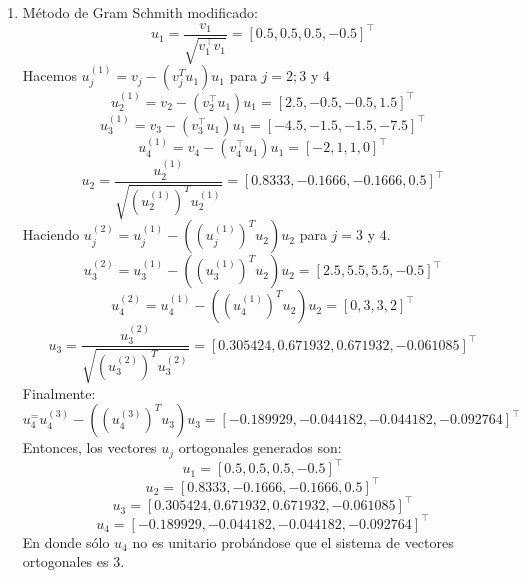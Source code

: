\begin{enumerate}[label=(\alph*)]
\item Método de Gram Schmith modificado:
\begin{equation}
    u_1 = \frac{v_1}{\sqrt{v_1^\intercal v_1}} = [0.5, 0.5, 0.5, -0.5]^\intercal
\end{equation}
Hacemos $u_j^{(1)}=v_j-(v_j^T u_1)u_1$ para $j=2;3$ y $4$
\begin{equation}
    u_2^{(1)}=v_2-(v_2^\intercal u_1)u_1 = [2.5, -0.5, -0.5, 1.5]^\intercal
\end{equation}
\begin{equation}
    u_3^{(1)}=v_3-(v_3^\intercal u_1)u_1 = [-4.5,  -1.5,  -1.5,  -7.5]^\intercal
\end{equation}
\begin{equation}
    u_4^{(1)}=v_4-(v_4^\intercal u_1)u_1 = [-2, 1, 1, 0]^\intercal
\end{equation}
\begin{equation}
    u_2=\frac{u_2^{(1)}}{\sqrt{(u_2^{(1)})^T u_2^{(1)}}} = [0.8333, -0.1666, -0.1666, 0.5]^\intercal
\end{equation}
Haciendo $u_j^{(2)}=u_j^{(1)}-((u_j^{(1)})^T u_2)u_2$ para $j=3$ y $4$.
\begin{equation}
    u_3^{(2)}=u_3^{(1)}-((u_3^{(1)})^T u_2)u_2 = [2.5,  5.5,  5.5,  -0.5]^\intercal
\end{equation}
\begin{equation}
    u_4^{(2)}=u_4^{(1)}-((u_4^{(1)})^T u_2)u_2 = [0,  3,  3,  2]^\intercal
\end{equation}
\begin{equation}
    u_3=\frac{u_3^{(2)}}{\sqrt{(u_3^{(2)})^T u_3^{(2)}}} = [0.305424,  0.671932,  0.671932,  -0.061085]^\intercal
\end{equation}
Finalmente:
\begin{equation}
    u_4^=u_4^{(3)}-((u_4^{(3)})^T u_3)u_3 = [-0.189929, -0.044182, -0.044182, -0.092764]^\intercal
\end{equation}
Entonces, los vectores $u_j$ ortogonales generados son:
\begin{equation}
    u_1 = [0.5,  0.5,  0.5,  -0.5]^\intercal
\end{equation}
\begin{equation}
    u_2 = [0.8333, -0.1666, -0.1666, 0.5]^\intercal
\end{equation}
\begin{equation}
    u_3 = [0.305424,  0.671932, 0.671932,  -0.061085]^\intercal
\end{equation}
\begin{equation}
    u_4 = [-0.189929,  -0.044182,  -0.044182, -0.092764]^\intercal
\end{equation}
En donde sólo $u_4$ no es unitario probándose que el sistema de vectores ortogonales es 3.

\end{enumerate}

